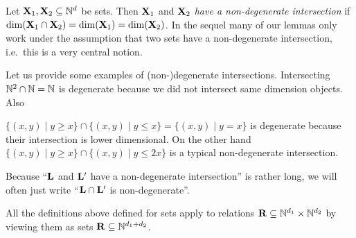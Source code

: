 Let \(\mathbf{X}_1, \mathbf{X}_2 \subseteq \mathbb{N}^d\) be sets. Then \(\mathbf{X}_1\) and \(\mathbf{X}_2\) \emph{have a non-degenerate intersection} if \(\dim(\mathbf{X}_1 \cap \mathbf{X}_2)=\dim(\mathbf{X}_1)=\dim(\mathbf{X}_2)\).
In the sequel many of our lemmas only work under the assumption that two sets have a non-degenerate intersection, i.e.\ this is a very central notion.

Let us provide some examples of (non-)degenerate intersections. Intersecting \(\mathbb{N}^2 \cap \mathbb{N}=\mathbb{N}\) is degenerate because we did not intersect same dimension objects. Also 

\(\{(x,y) \mid y \geq x\} \cap \{(x,y) \mid y \leq x\}=\{(x,y) \mid y=x\}\) is degenerate because their intersection is lower dimensional. On the other hand \(\{(x,y) \mid y \geq x\} \cap \{(x,y) \mid y \leq 2x\}\) is a typical non-degenerate intersection. 

Because ``\(\mathbf{L}\) and \(\mathbf{L}'\) have a non-degenerate intersection'' is rather long, we will often just write ``\(\mathbf{L} \cap \mathbf{L}'\) is non-degenerate''.

All the definitions above defined for sets apply to relations \(\mathbf{R} \subseteq \mathbb{N}^{d_1} \times \mathbb{N}^{d_2}\) by viewing them as sets \(\mathbf{R} \subseteq \mathbb{N}^{d_1+d_2}\).
